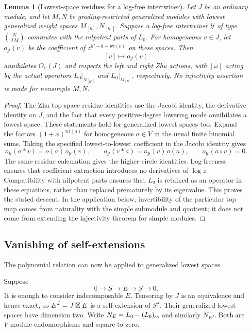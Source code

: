 \documentclass[11pt]{article}
\newtheorem{lemma}[theorem]{Lemma}
\numberwithin{equation}{section}
\begin{document}
\begin{lemma}[Lowest-space residues for a log-free intertwiner]\label{A:lowest:residue}
Let $J$ be an ordinary module, and let $M,N$ be grading-restricted generalized modules with lowest generalized weight spaces $M_{[h]},N_{[h']}$. Suppose a log-free intertwiner $\mathcal Y$ of type $\binom N{J\ M}$ commutes with the nilpotent parts of $L_0$. For homogeneous $v\in J$, let $o_{\mathcal Y}(v)$ be the coefficient of $z^{h'-h-\mathrm{wt}(v)}$ on these spaces. Then
\[
 [v]\longmapsto o_{\mathcal Y}(v)
\]
annihilates $O_V(J)$ and respects the left and right Zhu actions, with $[\omega]$ acting by the actual operators $L_0|_{N_{[h']}}$ and $L_0|_{M_{[h]}}$, respectively. No injectivity assertion is made for nonsimple $M,N$.
\end{lemma}
\begin{proof}
The Zhu top-space residue identities use the Jacobi identity, the derivative identity on $J$, and the fact that every positive-degree lowering mode annihilates a lowest space. These statements hold for generalized lowest spaces too. Expand the factors $(1+x)^{\mathrm{wt}(a)}$ for homogeneous $a\in V$ in the usual finite binomial sums. Taking the specified lowest-to-lowest coefficient in the Jacobi identity gives
\[
 o_{\mathcal Y}(a*v)=o(a)\,o_{\mathcal Y}(v),\qquad
 o_{\mathcal Y}(v*a)=o_{\mathcal Y}(v)\,o(a),\qquad
 o_{\mathcal Y}(a\circ v)=0.
\]
The same residue calculation gives the higher-circle identities. Log-freeness ensures that coefficient extraction introduces no derivatives of $\log z$. Compatibility with nilpotent parts ensures that $L_0$ is retained as an operator in these equations, rather than replaced prematurely by its eigenvalue. This proves the stated descent. In the application below, invertibility of the particular top map comes from naturality with the simple submodule and quotient; it does not come from extending the injectivity theorem for simple modules.
\end{proof}

\subsection{Vanishing of self-extensions}
The polynomial relation can now be applied to generalized lowest spaces.

Suppose
\begin{equation}\label{A:rat:E}
 0\longrightarrow S\longrightarrow E\longrightarrow S\longrightarrow0.
\end{equation}
It is enough to consider indecomposable $E$. Tensoring by $J$ is an equivalence and hence exact, so $E^J=J\boxtimes E$ is a self-extension of $S^J$. Their generalized lowest spaces have dimension two. Write $N_E=L_0-(L_0)_{\rm ss}$ and similarly $N_{E^J}$. Both are $V$-module endomorphisms and square to zero.
\end{document}
